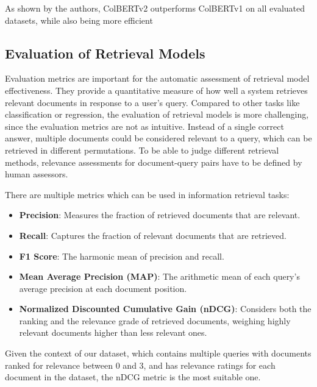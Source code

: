 As shown by the authors, ColBERTv2 outperforms ColBERTv1 on all evaluated datasets, while also being more efficient

\subsection{Evaluation of Retrieval Models}\label{sec:evaluation-of-retrieval-models}
Evaluation metrics are important for the automatic assessment of retrieval model effectiveness.
They provide a quantitative measure of how well a system retrieves relevant documents in response to a user's query.
Compared to other tasks like classification or regression, the evaluation of retrieval models is more challenging, since the evaluation metrics are not as intuitive.
Instead of a single correct answer, multiple documents could be considered relevant to a query, which can be retrieved in different permutations.
To be able to judge different retrieval methods, relevance assessments for document-query pairs have to be defined by human assessors.

There are multiple metrics which can be used in information retrieval tasks:
\begin{itemize}
    \item \textbf{Precision}: Measures the fraction of retrieved documents that are relevant.
    \item \textbf{Recall}: Captures the fraction of relevant documents that are retrieved.
    \item \textbf{F1 Score}: The harmonic mean of precision and recall.
    \item \textbf{Mean Average Precision (MAP)}: The arithmetic mean of each query's average precision at each document position.
    \item \textbf{Normalized Discounted Cumulative Gain (nDCG)}: Considers both the ranking and the relevance grade of retrieved documents, weighing highly relevant documents higher than less relevant ones.
\end{itemize}
Given the context of our dataset, which contains multiple queries with documents ranked for relevance between 0 and 3, and has relevance ratings for each document in the dataset, the nDCG metric is the most suitable one.

